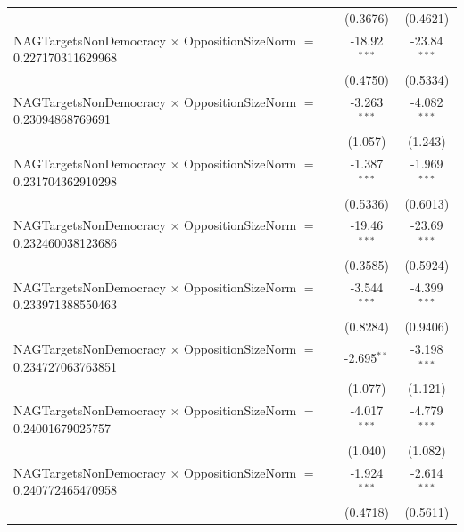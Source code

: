 \begin{tabular}{lcc}
                                                                                & (0.3676)             & (0.4621)\\   
   NAGTargetsNonDemocracy $\times$ OppositionSizeNorm $=$ 0.227170311629968     & -18.92$^{***}$       & -23.84$^{***}$\\   
                                                                                & (0.4750)             & (0.5334)\\   
   NAGTargetsNonDemocracy $\times$ OppositionSizeNorm $=$ 0.23094868769691      & -3.263$^{***}$       & -4.082$^{***}$\\   
                                                                                & (1.057)              & (1.243)\\   
   NAGTargetsNonDemocracy $\times$ OppositionSizeNorm $=$ 0.231704362910298     & -1.387$^{***}$       & -1.969$^{***}$\\   
                                                                                & (0.5336)             & (0.6013)\\   
   NAGTargetsNonDemocracy $\times$ OppositionSizeNorm $=$ 0.232460038123686     & -19.46$^{***}$       & -23.69$^{***}$\\   
                                                                                & (0.3585)             & (0.5924)\\   
   NAGTargetsNonDemocracy $\times$ OppositionSizeNorm $=$ 0.233971388550463     & -3.544$^{***}$       & -4.399$^{***}$\\   
                                                                                & (0.8284)             & (0.9406)\\   
   NAGTargetsNonDemocracy $\times$ OppositionSizeNorm $=$ 0.234727063763851     & -2.695$^{**}$        & -3.198$^{***}$\\   
                                                                                & (1.077)              & (1.121)\\   
   NAGTargetsNonDemocracy $\times$ OppositionSizeNorm $=$ 0.24001679025757      & -4.017$^{***}$       & -4.779$^{***}$\\   
                                                                                & (1.040)              & (1.082)\\   
   NAGTargetsNonDemocracy $\times$ OppositionSizeNorm $=$ 0.240772465470958     & -1.924$^{***}$       & -2.614$^{***}$\\   
                                                                                & (0.4718)             & (0.5611)\\   

\end{tabular}
